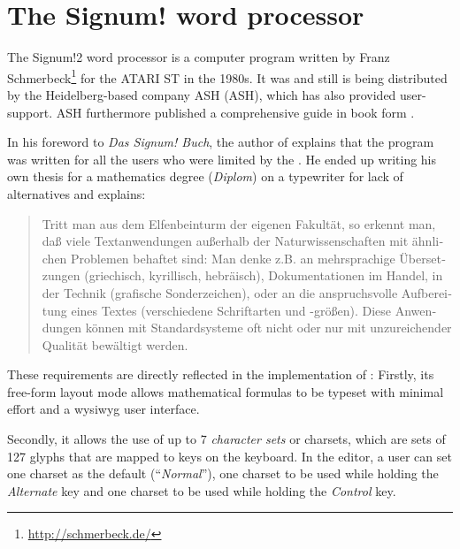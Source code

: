 \section{The Signum! word processor}

The \gls{Signum!2} word processor is a computer program written by Franz Schmerbeck\footnote{\url{http://schmerbeck.de/}} for the ATARI ST in the 1980s. It was and still is being distributed by the Heidelberg-based company \gls{ASH} (ASH), which has also provided user-support. ASH furthermore published a comprehensive guide in book form \cite{ritzhaupt1988signum}.

In his foreword to \textit{Das Signum! Buch}, the author of \Signum{} explains that the program was written for all the users who were limited by the . He ended up writing his own thesis for a mathematics degree (\textit{Diplom}) on a typewriter for lack of alternatives and explains:

\foreignblockquote{german}[{\cite[Page 7]{ritzhaupt1988signum}}]{
    
    Tritt man aus dem Elfenbeinturm der eigenen Fakultät, so erkennt man, daß viele Textanwendungen außerhalb der Naturwissenschaften mit ähnlichen Problemen behaftet sind: Man denke z.B. an mehrsprachige Übersetzungen (griechisch, kyrillisch, hebräisch), Dokumentationen im Handel, in der Technik (grafische Sonderzeichen), oder an die anspruchsvolle Aufbereitung eines Textes (verschiedene Schriftarten und -größen). Diese Anwendungen können mit Standardsysteme oft nicht oder nur mit unzureichender Qualität bewältigt werden.
    
}

These requirements are directly reflected in the implementation of \Signum{}: Firstly, its free-form layout mode allows mathematical formulas to be typeset with minimal effort and a \acrshort{wysiwyg} user interface.

Secondly, it allows the use of up to $7$ \textit{character sets} or \glspl{charset}, which are sets of 127 glyphs that are mapped to keys on the keyboard. In the editor, a user can set one charset as the default (``\textit{Normal}''), one charset to be used while holding the \textit{Alternate} key and one charset to be used while holding the \textit{Control} key.

